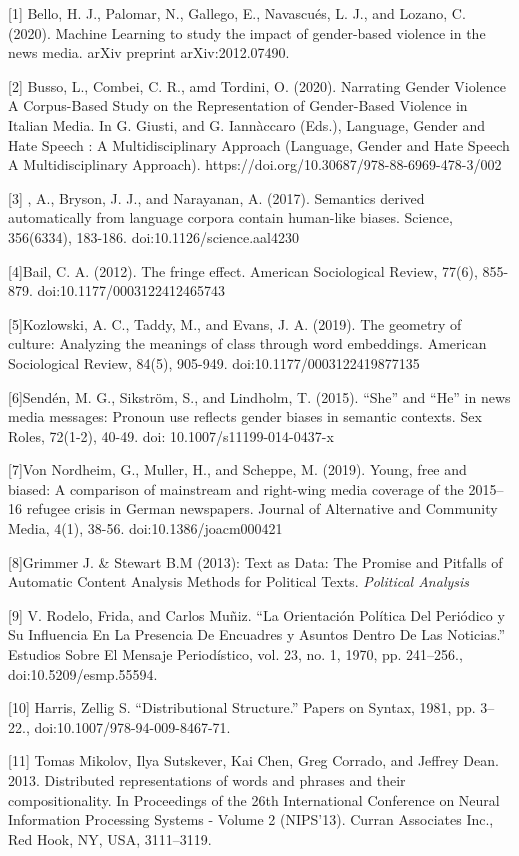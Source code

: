\documentclass{article}
\begin{document}
[1] Bello, H. J., Palomar, N., Gallego, E., Navascués, L. J., and Lozano, C. (2020). Machine Learning to study the impact of gender-based violence in the news media. arXiv preprint arXiv:2012.07490.

[2] Busso, L., Combei, C. R., amd Tordini, O. (2020). Narrating Gender Violence A Corpus-Based Study on the Representation of Gender-Based Violence in Italian Media. In G. Giusti, and G. Iannàccaro (Eds.), Language, Gender and Hate Speech : A Multidisciplinary Approach (Language, Gender and Hate Speech A Multidisciplinary Approach). https://doi.org/10.30687/978-88-6969-478-3/002

[3] , A., Bryson, J. J., and Narayanan, A. (2017). Semantics derived automatically from language corpora contain human-like biases. Science, 356(6334), 183-186. doi:10.1126/science.aal4230

[4]Bail, C. A. (2012). The fringe effect. American Sociological Review, 77(6), 855-879. doi:10.1177/0003122412465743

[5]Kozlowski, A. C., Taddy, M., and Evans, J. A. (2019). The geometry of culture: Analyzing the meanings of class through word embeddings. American Sociological Review, 84(5), 905-949. doi:10.1177/0003122419877135

[6]Sendén, M. G., Sikström, S., and Lindholm, T. (2015). “She” and “He” in news media messages: Pronoun use reflects gender biases in semantic contexts. Sex Roles, 72(1-2), 40-49. doi: 10.1007/s11199-014-0437-x

[7]Von Nordheim, G., Muller, H., and Scheppe, M. (2019). Young, free and biased: A comparison of mainstream and right-wing media coverage of the 2015–16 refugee crisis in German newspapers. Journal of Alternative and Community Media, 4(1), 38-56. doi:10.1386/joacm000421
 
[8]Grimmer J. \& Stewart B.M (2013): Text as Data: The Promise and Pitfalls of Automatic Content Analysis Methods for Political Texts. 
{\it Political Analysis}

[9] V. Rodelo, Frida, and Carlos Muñiz. “La Orientación Política Del Periódico y Su Influencia En La Presencia De Encuadres y Asuntos Dentro De Las Noticias.” Estudios Sobre El Mensaje Periodístico, vol. 23, no. 1, 1970, pp. 241–256., doi:10.5209/esmp.55594. 

[10] Harris, Zellig S. “Distributional Structure.” Papers on Syntax, 1981, pp. 3–22., doi:10.1007/978-94-009-8467-71. 

[11] Tomas Mikolov, Ilya Sutskever, Kai Chen, Greg Corrado, and Jeffrey Dean. 2013. Distributed representations of words and phrases and their compositionality. In Proceedings of the 26th International Conference on Neural Information Processing Systems - Volume 2 (NIPS'13). Curran Associates Inc., Red Hook, NY, USA, 3111–3119.

\newpage
\pagebreak
\end{document}
